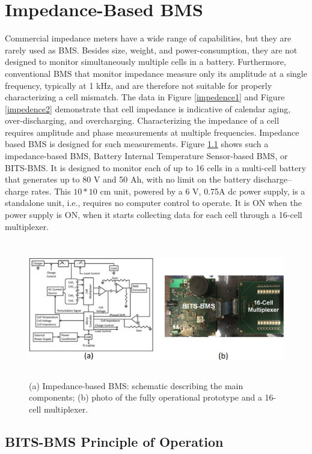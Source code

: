 \chapter{Impedance-Based BMS}

\hspace{0.5cm}
Commercial impedance meters have a wide range of capabilities, but they are rarely used as BMS. Besides size, weight, and power-consumption, they are not designed to monitor simultaneously multiple cells in a battery. Furthermore, conventional BMS that monitor impedance measure only its amplitude at a single frequency, typically at 1 kHz, and are therefore not suitable for properly characterizing a cell mismatch. The data in Figure \ref{impedence1} and Figure \ref{impedence2} demonstrate that cell impedance is indicative of calendar aging, over-discharging, and overcharging. Characterizing the impedance of a cell requires amplitude and phase measurements at multiple frequencies. Impedance based BMS is designed for such measurements. Figure \ref{BLOCK} shows such a impedance-based BMS, Battery Internal Temperature Sensor-based BMS, or BITS-BMS. It is designed to monitor each of up to 16 cells in a multi-cell battery that generates up to 80 V and 50 Ah, with no limit on the battery discharge–charge rates. This $10\ast10$ cm unit, powered by a 6 V, 0.75A dc power supply, is a standalone unit, i.e., requires no computer control to operate. It is ON when the power supply is ON, when it starts collecting data for each cell through a 16-cell multiplexer. 

\begin{figure}[H]
	\includegraphics[width=16cm,height=6cm]{figures/BLOCK}
	\centering
	\caption{(a) Impedance-based BMS: schematic describing the main components; (b) photo of the fully operational prototype and a 16-cell multiplexer.} \label{BLOCK}
\end{figure}

\section{BITS-BMS Principle of Operation}

